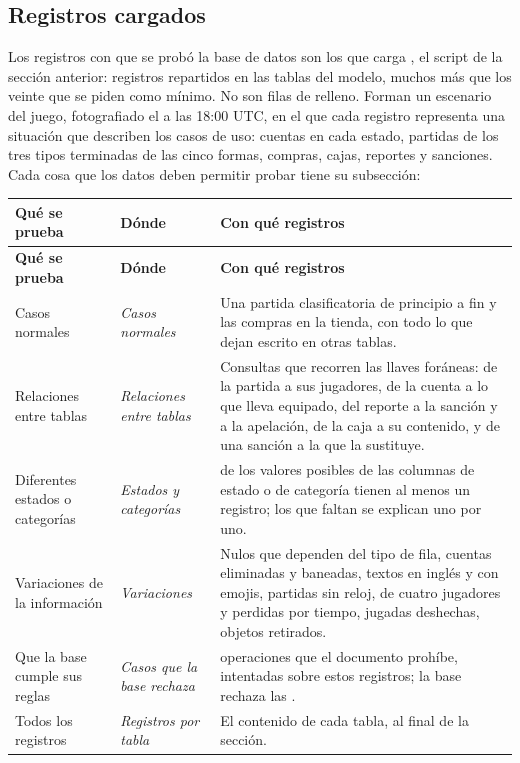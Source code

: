 \subsection*{Registros cargados}

Los registros con que se probó la base de datos son los que carga , el script de la sección anterior: \dpNumFilas{} registros repartidos en las \dpNumTablasConDatos{} tablas del modelo, muchos más que los veinte que se piden como mínimo. No son filas de relleno. Forman un escenario del juego, fotografiado el \dpFecha{} a las 18:00 UTC, en el que cada registro representa una situación que describen los casos de uso: cuentas en cada estado, partidas de los tres tipos terminadas de las cinco formas, compras, cajas, reportes y sanciones. Cada cosa que los datos deben permitir probar tiene su subsección:

\begin{center}\small
\begin{longtable}{|L{0.22\textwidth}|L{0.2\textwidth}|L{0.48\textwidth}|}
\hline
\textbf{Qué se prueba} & \textbf{Dónde} & \textbf{Con qué registros} \\ \hline
\endfirsthead
\hline
\textbf{Qué se prueba} & \textbf{Dónde} & \textbf{Con qué registros} \\ \hline
\endhead
Casos normales & \textit{Casos normales} & Una partida clasificatoria de principio a fin y las compras en la tienda, con todo lo que dejan escrito en otras tablas. \\ \hline
Relaciones entre tablas & \textit{Relaciones entre tablas} & Consultas que recorren las llaves foráneas: de la partida a sus jugadores, de la cuenta a lo que lleva equipado, del reporte a la sanción y a la apelación, de la caja a su contenido, y de una sanción a la que la sustituye. \\ \hline
Diferentes estados o categorías & \textit{Estados y categorías} & \dnNumValoresConFilas{} de los \dnNumValores{} valores posibles de las \dnNumDominios{} columnas de estado o de categoría tienen al menos un registro; los que faltan se explican uno por uno. \\ \hline
Variaciones de la información & \textit{Variaciones} & Nulos que dependen del tipo de fila, cuentas eliminadas y baneadas, textos en inglés y con emojis, partidas sin reloj, de cuatro jugadores y perdidas por tiempo, jugadas deshechas, objetos retirados. \\ \hline
Que la base cumple sus reglas & \textit{Casos que la base rechaza} & \dnNumPruebasRechazo{} operaciones que el documento prohíbe, intentadas sobre estos registros; la base rechaza las \dnNumPruebasRechazadas{}. \\ \hline
Todos los registros & \textit{Registros por tabla} & El contenido de cada tabla, al final de la sección. \\ \hline
\end{longtable}
\end{center}

